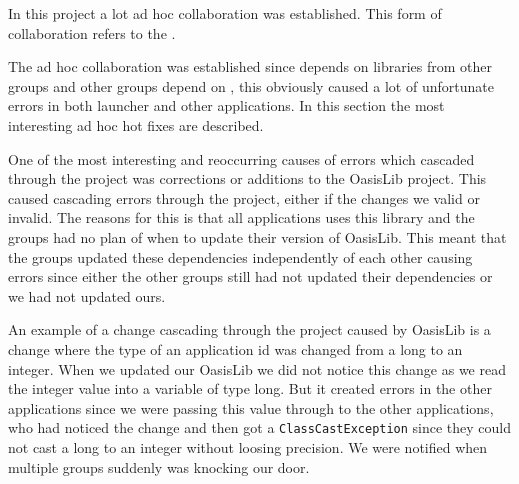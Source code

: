 In this project a lot ad hoc collaboration was established.
This form of collaboration refers to the \Cref{}. %

The ad hoc collaboration was established since \launcher depends on libraries from other groups and other groups depend on \launcher, this obviously caused a lot of unfortunate errors in both launcher and other applications.
In this section the most interesting ad hoc hot fixes are described.

One of the most interesting and reoccurring causes of errors which cascaded through the \giraf project was corrections or additions to the OasisLib project.
This caused cascading errors through the project, either if the changes we valid or invalid.
The reasons for this is that all applications uses this library and the groups had no plan of when to update their version of OasisLib.
This meant that the groups updated these dependencies independently of each other causing errors since either the other groups still had not updated their dependencies or we had not updated ours.

An example of a change cascading through the project caused by OasisLib is a change where the type of an application id was changed from a long to an integer.
When we updated our OasisLib we did not notice this change as we read the integer value into a variable of type long.
But it created errors in the other applications since we were passing this value through to the other applications, who had noticed the change and then got a \lstinline!ClassCastException! since they could not cast a long to an integer without loosing precision.
We were notified when multiple groups suddenly was knocking our door.





